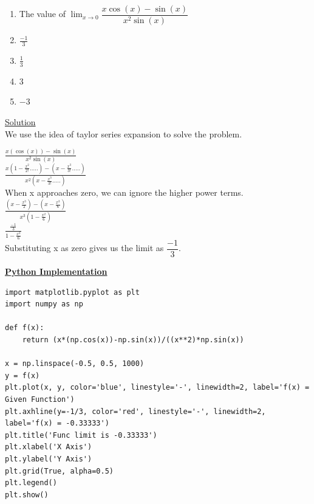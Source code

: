 \documentclass{article}
\begin{document}
\hfill\begin{minipage}{\linewidth}
    \begin{enumerate}
    \item[Q.37] The value of $\lim_{x\to 0}\dfrac{x\cos(x)-\sin(x)}{x^2\sin(x)}$
        \item[(A)] $\frac{-1}{3}$
        \item[(B)] $\frac{1}{3}$
        \item[(C)] $3$
        \item[(D)]$-3$
    \end{enumerate}
        \underline{Solution}\medskip\\
        We use the idea of taylor series expansion to solve the problem.\\
        
        \begin{center}
        $\frac{x(\cos(x))-\sin(x)}{x^2\sin(x)}$\\
        $\frac{x(1-\frac{x^2}{2!} .....)-(x-\frac{x^3}{3!}.....)}{x^2(x-\frac{x^3}{3!}.....)}$\\
        When x approaches zero, we can ignore the higher power terms.\\
        $\frac{(x-\frac{x^3}{2})-(x-\frac{x^3}{6})}{x^3(1-\frac{x^2}{6})}$\\
        $\frac{\frac{-1}{3}}{1-\frac{x^2}{6}}$\\
        Substituting x as zero gives us the limit as $\dfrac{-1}{3}$.
        \end{center}
        
\end{minipage}
\large\underline{\textbf{Python Implementation}}\bigskip\\
\begin{lstlisting}[style=pycode,frame=single]
import matplotlib.pyplot as plt
import numpy as np

def f(x):
    return (x*(np.cos(x))-np.sin(x))/((x**2)*np.sin(x))

x = np.linspace(-0.5, 0.5, 1000)
y = f(x)
plt.plot(x, y, color='blue', linestyle='-', linewidth=2, label='f(x) = Given Function')
plt.axhline(y=-1/3, color='red', linestyle='-', linewidth=2, label='f(x) = -0.33333')
plt.title('Func limit is -0.33333')
plt.xlabel('X Axis')
plt.ylabel('Y Axis')
plt.grid(True, alpha=0.5)
plt.legend() 
plt.show()
\end{lstlisting}\vspace{1cm}
\end{document}
